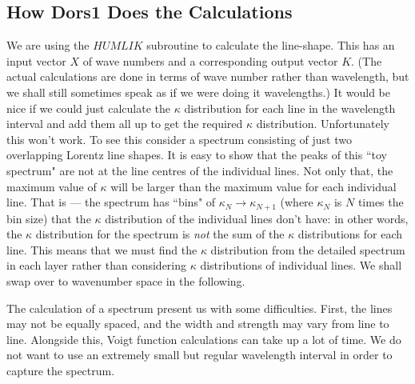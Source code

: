 \documentclass[12pt]{article}
\begin{document}
\subsection{How Dors1 Does the Calculations}

We are using the $HUMLIK$ subroutine to calculate the line-shape. This has an input vector $X$ of
 wave numbers and a
corresponding output vector $K$. (The actual calculations are done in terms of wave number rather than wavelength,
 but we shall still sometimes speak as if we were doing it wavelengths.)
It would be nice if we could just calculate the $\kappa$ distribution for each
line in the wavelength interval and add them all up to get the required $\kappa$ distribution.
Unfortunately this won't work. To see this consider a spectrum consisting of just two overlapping Lorentz line shapes.
 It is easy to show that the peaks of this ``toy spectrum" are not at the line centres of the individual
lines. Not only that, the maximum value of $\kappa$ will be larger than the maximum value for each individual line.
That is --- the spectrum has ``bins" of $\kappa_N \rightarrow \kappa_{N+1}$ (where $\kappa_N$ is $N$ times the bin size)
 that the $\kappa$ distribution of the individual lines don't have: in other words, the $\kappa$ distribution for
the spectrum is {\it not} the sum of the $\kappa$ distributions for each line.
This means that we must find the $\kappa$ distribution from the detailed spectrum in each layer rather
than considering $\kappa$ distributions of individual lines.  We shall swap over to wavenumber space in the following.

The calculation of a spectrum present us with some difficulties.
 First, the lines may not be equally spaced, and the width
and strength may vary from line to line. Alongside this, Voigt function calculations can take up
a lot of time. We do not want to use an extremely small but regular wavelength interval 
in order to capture the spectrum. 
\end{document}
